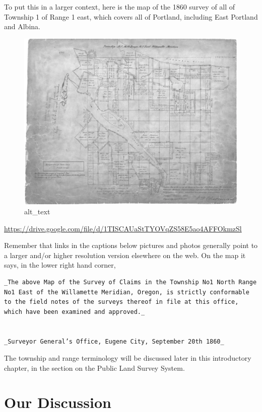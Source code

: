 \documentclass[
  12pt,
]{book}
\begin{document}
To put this in a larger context, here is the map of the 1860 survey of all of Township 1 of Range 1 east, which covers all of Portland, including East Portland and Albina.

\begin{figure}
\centering
\includegraphics{images/02_images/image2.png}
\caption{alt\_text}
\end{figure}

\url{https://drive.google.com/file/d/1TISCAUaStTYOVqZS58E5ao4AFFOkmzSl}

Remember that links in the captions below pictures and photos generally point to a larger and/or higher resolution version elsewhere on the web. On the map it says, in the lower right hand corner,

\begin{verbatim}
_The above Map of the Survey of Claims in the Township No1 North Range No1 East of the Willamette Meridian, Oregon, is strictly conformable to the field notes of the surveys thereof in file at this office, which have been examined and approved._


_Surveyor General’s Office, Eugene City, September 20th 1860_
\end{verbatim}

The township and range terminology will be discussed later in this introductory chapter, in the section on the Public Land Survey System.

\hypertarget{our-discussion}{%
\section{Our Discussion}\label{our-discussion}}
\end{document}
